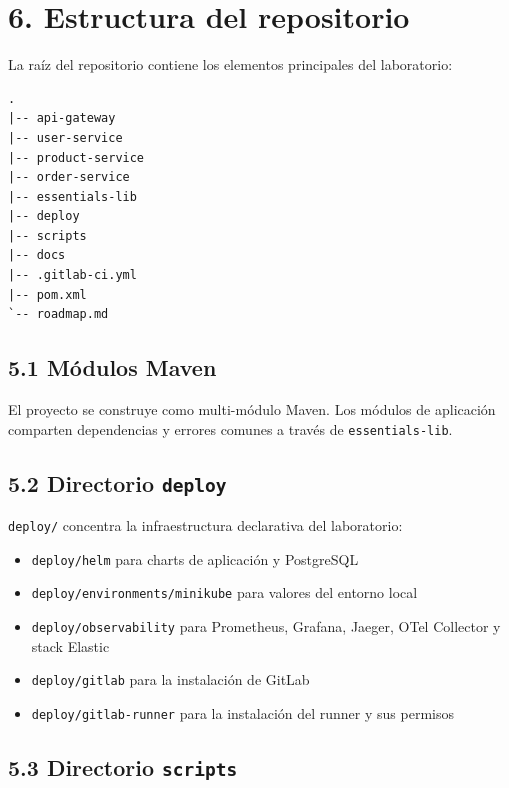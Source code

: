 \documentclass[
a4paper,
12pt]{report}
\providecommand{\tightlist}{%
  \setlength{\itemsep}{0pt}\setlength{\parskip}{0pt}}
\begin{document}
\chapter{6. Estructura del
repositorio}\label{estructura-del-repositorio}

La raíz del repositorio contiene los elementos principales del
laboratorio:

\begin{verbatim}
.
|-- api-gateway
|-- user-service
|-- product-service
|-- order-service
|-- essentials-lib
|-- deploy
|-- scripts
|-- docs
|-- .gitlab-ci.yml
|-- pom.xml
`-- roadmap.md
\end{verbatim}

\section{5.1 Módulos Maven}\label{muxf3dulos-maven}

El proyecto se construye como multi-módulo Maven. Los módulos de
aplicación comparten dependencias y errores comunes a través de
\texttt{essentials-lib}.

\section{\texorpdfstring{5.2 Directorio
\texttt{deploy}}{5.2 Directorio deploy}}\label{directorio-deploy}

\texttt{deploy/} concentra la infraestructura declarativa del
laboratorio:

\begin{itemize}
\tightlist
\item
  \texttt{deploy/helm} para charts de aplicación y PostgreSQL
\item
  \texttt{deploy/environments/minikube} para valores del entorno local
\item
  \texttt{deploy/observability} para Prometheus, Grafana, Jaeger, OTel
  Collector y stack Elastic
\item
  \texttt{deploy/gitlab} para la instalación de GitLab
\item
  \texttt{deploy/gitlab-runner} para la instalación del runner y sus
  permisos
\end{itemize}

\section{\texorpdfstring{5.3 Directorio
\texttt{scripts}}{5.3 Directorio scripts}}\label{directorio-scripts}
\end{document}
